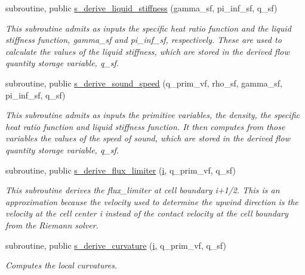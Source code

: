 \begin{Indent}
\begin{DoxyCompactItemize}
subroutine, public \hyperlink{namespacem__derived__variables_a02166198be4da04f6b6ce69fd432910d}{s\+\_\+derive\+\_\+liquid\+\_\+stiffness} (gamma\+\_\+sf, pi\+\_\+inf\+\_\+sf, q\+\_\+sf)
\begin{DoxyCompactList}\small\item\em This subroutine admits as inputs the specific heat ratio function and the liquid stiffness function, gamma\+\_\+sf and pi\+\_\+inf\+\_\+sf, respectively. These are used to calculate the values of the liquid stiffness, which are stored in the derived flow quantity storage variable, q\+\_\+sf. \end{DoxyCompactList}\item 
subroutine, public \hyperlink{namespacem__derived__variables_a51eb66162227584de46a25cac55b5b6b}{s\+\_\+derive\+\_\+sound\+\_\+speed} (q\+\_\+prim\+\_\+vf, rho\+\_\+sf, gamma\+\_\+sf, pi\+\_\+inf\+\_\+sf, q\+\_\+sf)
\begin{DoxyCompactList}\small\item\em This subroutine admits as inputs the primitive variables, the density, the specific heat ratio function and liquid stiffness function. It then computes from those variables the values of the speed of sound, which are stored in the derived flow quantity storage variable, q\+\_\+sf. \end{DoxyCompactList}\item 
subroutine, public \hyperlink{namespacem__derived__variables_ac85e77b0312f21389eb166960446f6ec}{s\+\_\+derive\+\_\+flux\+\_\+limiter} (\hyperlink{m__data__output_8f90_aaea4baed8fd8b780f6938f0dc1fb0f72}{i}, q\+\_\+prim\+\_\+vf, q\+\_\+sf)
\begin{DoxyCompactList}\small\item\em This subroutine derives the flux\+\_\+limiter at cell boundary i+1/2. This is an approximation because the velocity used to determine the upwind direction is the velocity at the cell center i instead of the contact velocity at the cell boundary from the Riemann solver. \end{DoxyCompactList}\item 
subroutine, public \hyperlink{namespacem__derived__variables_a2c43e6d73417e237731fdad2eea07b22}{s\+\_\+derive\+\_\+curvature} (\hyperlink{m__data__output_8f90_aaea4baed8fd8b780f6938f0dc1fb0f72}{i}, q\+\_\+prim\+\_\+vf, q\+\_\+sf)
\begin{DoxyCompactList}\small\item\em Computes the local curvatures. \end{DoxyCompactList}\item 

\end{DoxyCompactItemize}
\end{Indent}
